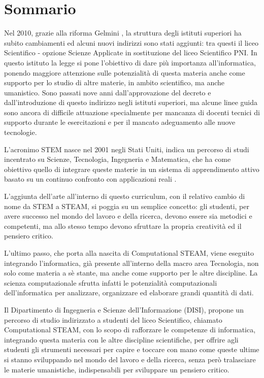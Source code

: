 \chapter*{Sommario} %
\label{sommario}


Nel 2010, grazie alla riforma Gelmini \cite{riforma}, la struttura degli istituti superiori ha subito cambiamenti ed alcuni nuovi indirizzi sono stati aggiunti: tra questi il liceo Scientifico - opzione Scienze Applicate in sostituzione del liceo Scientifico PNI. In questo istituto la legge si pone l'obiettivo di dare più importanza all'informatica, ponendo maggiore attenzione sulle potenzialità di questa materia anche come supporto per lo studio di altre materie, in ambito scientifico, ma anche umanistico. Sono passati nove anni dall'approvazione del decreto e dall'introduzione di questo indirizzo negli istituti superiori, ma alcune linee guida sono ancora di difficile attuazione specialmente per mancanza di docenti tecnici di supporto durante le esercitazioni e per il mancato adeguamento alle nuove tecnologie. 

L'acronimo STEM nasce nel 2001 negli Stati Uniti, indica un percorso di studi incentrato su Scienze, Tecnologia, Ingegneria e Matematica, che ha come obiettivo quello di integrare queste materie in un sistema di apprendimento attivo basato su un continuo confronto con applicazioni reali \cite{stem_education}. 

L'aggiunta dell'arte all'interno di questo curriculum, con il relativo cambio di nome da STEM a STEAM, si poggia su un semplice concetto: gli studenti, per avere successo nel mondo del lavoro e della ricerca, devono essere sia metodici e competenti, ma allo stesso tempo devono sfruttare la propria creatività ed il pensiero critico. 

L'ultimo passo, che porta alla nascita di Computational STEAM, viene eseguito integrando l'informatica, già presente all'interno della macro area Tecnologia, non solo come materia a sè stante, ma anche come supporto per le altre discipline. La scienza computazionale sfrutta infatti le potenzialità computazionali dell'informatica per analizzare, organizzare ed elaborare grandi quantità di dati.

Il Dipartimento di Ingegneria e Scienze dell'Informazione (DISI), propone un percorso di studio indirizzato a studenti del liceo Scientifico, chiamato Computational STEAM, con lo scopo di rafforzare le competenze di informatica, integrando questa materia con le altre discipline scientifiche, per offrire agli studenti gli strumenti necessari per capire e toccare con mano come queste ultime si stanno sviluppando nel mondo del lavoro e della ricerca, senza però tralasciare le materie umanistiche, indispensabili per sviluppare un pensiero critico.

